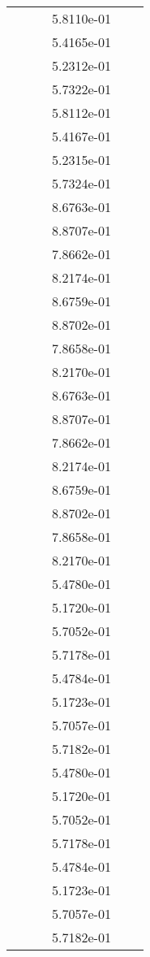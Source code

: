 \begin{xltabular}{\textwidth}{r|rS[table-format=1.3e+2]S[table-format=1.4e+2]S[table-format=1.4e+2]S[table-format=-1.5]}
&  &  & 5.8110e-01 & & \\
&  &  & 5.4165e-01 & & \\
&  &  & 5.2312e-01 & & \\
&  &  & 5.7322e-01 & & \\
&  &  & 5.8112e-01 & & \\
&  &  & 5.4167e-01 & & \\
&  &  & 5.2315e-01 & & \\
&  &  & 5.7324e-01 & & \\
&  &  & 8.6763e-01 & & \\
&  &  & 8.8707e-01 & & \\
&  &  & 7.8662e-01 & & \\
&  &  & 8.2174e-01 & & \\
&  &  & 8.6759e-01 & & \\
&  &  & 8.8702e-01 & & \\
&  &  & 7.8658e-01 & & \\
&  &  & 8.2170e-01 & & \\
&  &  & 8.6763e-01 & & \\
&  &  & 8.8707e-01 & & \\
&  &  & 7.8662e-01 & & \\
&  &  & 8.2174e-01 & & \\
&  &  & 8.6759e-01 & & \\
&  &  & 8.8702e-01 & & \\
&  &  & 7.8658e-01 & & \\
&  &  & 8.2170e-01 & & \\
&  &  & 5.4780e-01 & & \\
&  &  & 5.1720e-01 & & \\
&  &  & 5.7052e-01 & & \\
&  &  & 5.7178e-01 & & \\
&  &  & 5.4784e-01 & & \\
&  &  & 5.1723e-01 & & \\
&  &  & 5.7057e-01 & & \\
&  &  & 5.7182e-01 & & \\
&  &  & 5.4780e-01 & & \\
&  &  & 5.1720e-01 & & \\
&  &  & 5.7052e-01 & & \\
&  &  & 5.7178e-01 & & \\
&  &  & 5.4784e-01 & & \\
&  &  & 5.1723e-01 & & \\
&  &  & 5.7057e-01 & & \\
&  &  & 5.7182e-01 & & \\

\end{xltabular}
